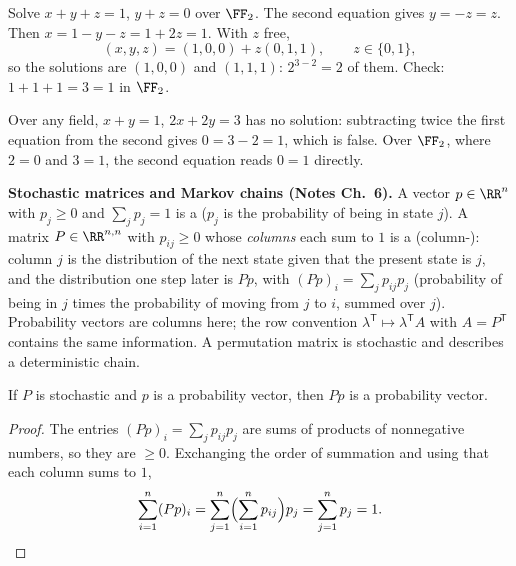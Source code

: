 \documentclass[10pt]{scrartcl}
\begin{document}
\begin{example*}
  Solve $x+y+z=1$, $y+z=0$ over $\FF_2$. The second equation gives $y=-z=z$. Then $x=1-y-z=1+2z=1$. With $z$ free,
  \[
    (x,y,z)=(1,0,0)+z(0,1,1),\qquad z\in\{0,1\},
  \]
  so the solutions are $(1,0,0)$ and $(1,1,1)$: $2^{3-2}=2$ of them. Check: $1+1+1=3=1$ in $\FF_2$.
\end{example*}

\begin{example*}
  Over any field, $x+y=1$, $2x+2y=3$ has no solution: subtracting twice the first equation from the second gives $0=3-2=1$, which is false. Over $\FF_2$, where $2=0$ and $3=1$, the second equation reads $0=1$ directly.
\end{example*}

\textbf{Stochastic matrices and Markov chains (Notes Ch.~6).} A vector $p\in\RR^n$ with $p_j\ge 0$ and $\sum_jp_j=1$ is a  ($p_j$ is the probability of being in state $j$). A matrix $P\in\RR^{n,n}$ with $p_{ij}\ge 0$ whose \emph{columns} each sum to $1$ is a (column-): column $j$ is the distribution of the next state given that the present state is $j$, and the distribution one step later is $Pp$, with $(Pp)_i=\sum_jp_{ij}p_j$ (probability of being in $j$ times the probability of moving from $j$ to $i$, summed over $j$). Probability vectors are columns here; the row convention $\lambda^{\mathsf T}\mapsto\lambda^{\mathsf T}A$ with $A=P^{\mathsf T}$ contains the same information. A permutation matrix is stochastic and describes a deterministic chain.

\begin{proposition*}
  If $P$ is stochastic and $p$ is a probability vector, then $Pp$ is a probability vector.
\end{proposition*}
\begin{proof}
  The entries $(Pp)_i=\sum_jp_{ij}p_j$ are sums of products of nonnegative numbers, so they are $\ge0$. Exchanging the order of summation and using that each column sums to $1$,
  \[
    \sum_{i=1}^n(Pp)_i=\sum_{j=1}^n\Bigl(\sum_{i=1}^np_{ij}\Bigr)p_j=\sum_{j=1}^np_j=1. \qedhere
  \]
\end{proof}
\end{document}
